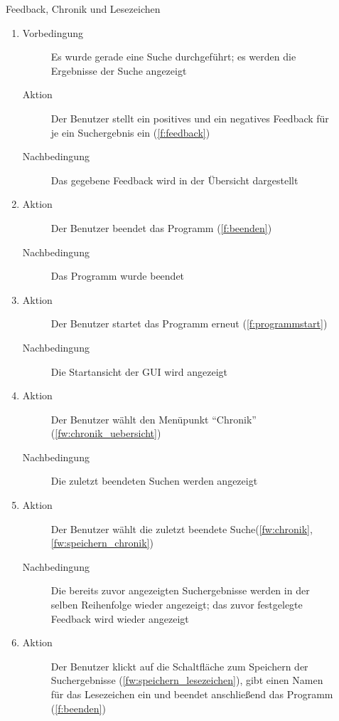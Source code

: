 \begin{description}
	\item[] Feedback, Chronik und Lesezeichen
	\begin{enumerate}
		\item
		\begin{description}
			\item[Vorbedingung] Es wurde gerade eine Suche durchgeführt; es werden die Ergebnisse der Suche angezeigt
			\item[Aktion] Der Benutzer stellt ein positives und ein negatives Feedback für je ein Suchergebnis ein (\ref{f:feedback})
			\item[Nachbedingung] Das gegebene Feedback wird in der Übersicht dargestellt
		\end{description}
		\item
		\begin{description}
			\item[Aktion] Der Benutzer beendet das Programm (\ref{f:beenden})
			\item[Nachbedingung] Das Programm wurde beendet
		\end{description}
		\item
		\begin{description}
			\item[Aktion] Der Benutzer startet das Programm erneut (\ref{f:programmstart})
			\item[Nachbedingung] Die Startansicht der GUI wird angezeigt
		\end{description}
		\item
		\begin{description}
			\item[Aktion] Der Benutzer wählt den Menüpunkt \enquote{Chronik} (\ref{fw:chronik_uebersicht})
			\item[Nachbedingung] Die zuletzt beendeten Suchen werden angezeigt
		\end{description}
		\item
		\begin{description}
			\item[Aktion] Der Benutzer wählt die zuletzt beendete Suche(\ref{fw:chronik}, \ref{fw:speichern_chronik})
			\item[Nachbedingung] Die bereits zuvor angezeigten Suchergebnisse werden in der selben Reihenfolge wieder angezeigt; das zuvor festgelegte Feedback wird wieder angezeigt
		\end{description}
		\item
		\begin{description}
			\item[Aktion] Der Benutzer klickt auf die Schaltfläche zum Speichern der Suchergebnisse (\ref{fw:speichern_lesezeichen}), gibt einen Namen für das Lesezeichen ein und beendet anschließend das Programm (\ref{f:beenden})

\end{description}
\end{enumerate}
\end{description}
